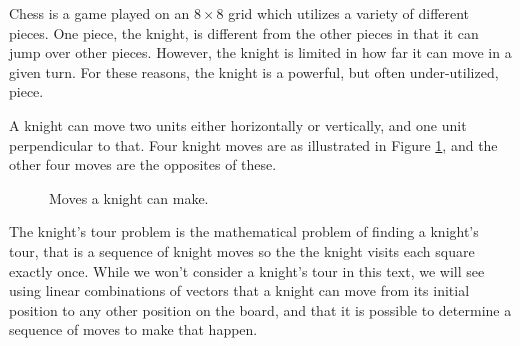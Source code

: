  \label{sec:vector_representation}

\vspace*{-17 pt}

\vspace*{13 pt}


Chess is a game played on an $8 \times 8$ grid which utilizes a variety of different pieces. One piece, the knight, is different from the other pieces in that it can jump over other pieces. However, the knight is limited in how far it can move in a given turn. For these reasons, the knight is a powerful, but often under-utilized, piece. 

A knight can move two units either horizontally or vertically, and one unit perpendicular to that. Four knight moves are  as illustrated in Figure \ref{F:knight_1}, and the other four moves are the opposites of these. 
\begin{figure}[h]
\begin{center}
\caption{Moves a knight can make.}
\label{F:knight_1}
\end{center}
\end{figure}

The knight's tour problem is the mathematical problem of finding a knight's tour, that is a sequence of knight moves so the the knight visits each square exactly once. While we won't consider a knight's tour in this text, we will see using linear combinations of vectors that a knight can move from its initial position to any other position on the board, and that it is possible to determine a sequence of moves to make that happen.

